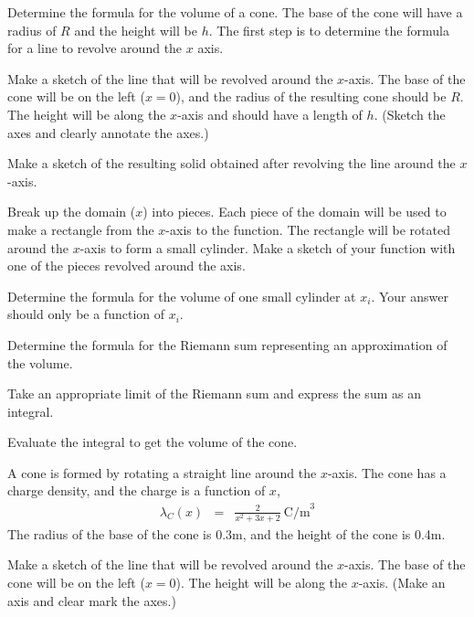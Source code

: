 \begin{problem}
\item Determine the formula for the volume of a cone.
    The base of the cone will have a radius of $R$ and the height will be $h$.
    The first step is to determine the formula for a line to revolve around the $x$ axis.
  \begin{subproblem}
    \item
      Make a sketch of the line that will be revolved around the $x$-axis.
      The base of the cone will be on the left ($x=0$), and the radius of the resulting cone should be $R$.
      The height will be along the $x$-axis and should have a length of $h$.
      (Sketch the axes and clearly annotate the axes.)
      \vfill

    \item Make a sketch of the resulting solid obtained after
      revolving the line around the $x$-axis.
      \vfill

    \item Break up the domain ($x$) into pieces. Each piece of the domain will be used to make a rectangle
         from the $x$-axis to the function. The rectangle will be rotated around the $x$-axis to form a small cylinder.
         Make a sketch of your function with one of the pieces revolved around the axis.
      \vfill

    \clearpage

    \item Determine the formula for the volume of one small cylinder at $x_i$. Your answer should only be a function of $x_i$.
      \vfill

    \item Determine the formula for the Riemann sum representing an approximation of the volume.
      \vfill

    \item Take an appropriate limit of the Riemann sum and express the sum as an integral.
      \vfill

    \item Evaluate the integral to get the volume of the cone.
      \vfill

  \end{subproblem}

  \clearpage

  \item A cone is formed by rotating a straight line around the $x$-axis.
     The cone has a charge density, and the charge is a function of $x$,
     \begin{eqnarray*}
       \lambda_C(x) & = & \frac{2}{x^2+3x+2} ~ \mathrm{C/m}^3
     \end{eqnarray*}
     The radius of the base of the cone is 0.3m, and the height of the cone is 0.4m.
     \begin{subproblem}
       \item
         Make a sketch of the line that will be revolved around the $x$-axis.
         The base of the cone will be on the left ($x=0$).
         The height will be along the $x$-axis.
         (Make an axis and clear mark the axes.)
         \vfill


\end{subproblem}
\end{problem}
